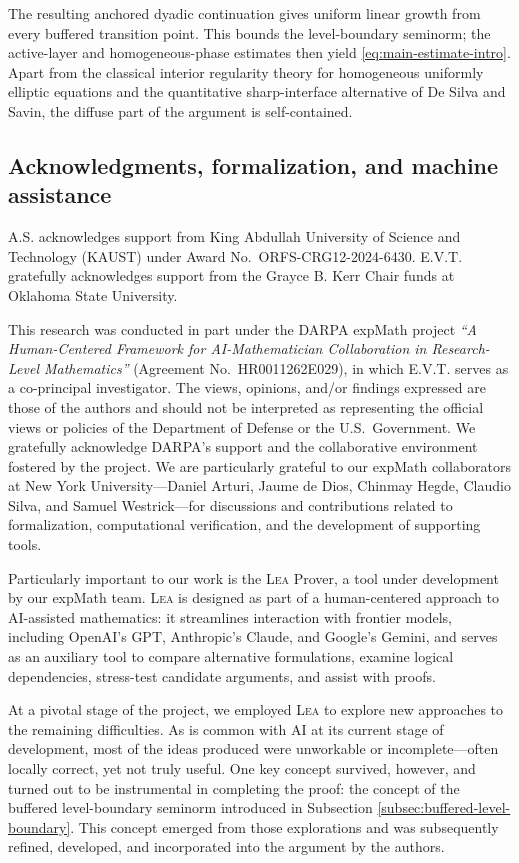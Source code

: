 \documentclass[11pt,letterpaper]{amsart}
\numberwithin{equation}{section}
\theoremstyle{definition}
\theoremstyle{remark}
\begin{document}
The resulting anchored dyadic continuation gives uniform linear growth from
every buffered transition point. This bounds the level-boundary seminorm; the
active-layer and homogeneous-phase estimates then yield
\eqref{eq:main-estimate-intro}. Apart from the classical interior regularity
theory for homogeneous uniformly elliptic equations and the quantitative
sharp-interface alternative of De Silva and Savin, the diffuse part of the
argument is self-contained.

\subsection{Acknowledgments, formalization, and machine assistance}
\label{subsec:ack-formalization-ai}

A.S. acknowledges support from King Abdullah University of Science and
Technology (KAUST) under Award No.~ORFS-CRG12-2024-6430. E.V.T. gratefully
acknowledges support from the Grayce B. Kerr Chair funds at Oklahoma State
University.

This research was conducted in part under the DARPA expMath project
\emph{``A Human-Centered Framework for AI-Mathematician Collaboration in
Research-Level Mathematics''} (Agreement No.\ HR0011262E029), in which E.V.T.
serves as a co-principal investigator.
%
The views, opinions, and/or findings expressed are those of the authors and
should not be interpreted as representing the official views or policies of
the Department of Defense or the U.S.\ Government.
%
We gratefully acknowledge DARPA's support and the collaborative environment
fostered by the project. We are particularly grateful to our expMath
collaborators at New York University---Daniel Arturi, Jaume de Dios, Chinmay
Hegde, Claudio Silva, and Samuel Westrick---for discussions and contributions
related to formalization, computational verification, and the development of
supporting tools.

Particularly important to our work is the \textsc{Lea} Prover, a tool under
development by our expMath team. \textsc{Lea} is designed as part of a
human-centered approach to AI-assisted mathematics: it streamlines interaction
with frontier models, including OpenAI's GPT, Anthropic's Claude, and Google's
Gemini, and serves as an auxiliary tool to compare alternative formulations,
examine logical dependencies, stress-test candidate arguments, and assist with
proofs.

At a pivotal stage of the project, we employed \textsc{Lea} to explore new approaches to the remaining difficulties. As is common with AI at its current stage of development, most of the ideas produced
were unworkable or incomplete---often locally correct, yet not truly useful. One key
concept survived, however, and turned out to be instrumental in completing the
proof: the concept of the buffered level-boundary seminorm introduced in Subsection \ref{subsec:buffered-level-boundary}. This concept emerged from those explorations and was subsequently refined, developed, and
incorporated into the argument by the authors.
\end{document}
